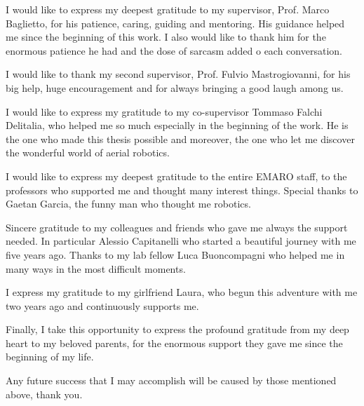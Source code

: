 

\begin{acknowledgements}


I would like to express my deepest gratitude to my supervisor, Prof. Marco Baglietto, for his patience, caring, guiding and mentoring. His guidance helped me since the beginning of this work. I also would like to thank him for the enormous patience he had and the dose of sarcasm added o each conversation. 

I would like to thank my second supervisor, Prof. Fulvio Mastrogiovanni, for his big help, huge encouragement and for always bringing a good laugh among us. 

I would like to express my gratitude to my co-supervisor Tommaso Falchi Delitalia, who helped me so much especially in the beginning of the work. He is the one who made this thesis possible and moreover, the one who let me discover the wonderful world of aerial robotics.

I would like to express my deepest gratitude to the entire EMARO staff, to the professors who supported me and thought many interest things. Special thanks to Gaetan Garcia, the funny man who thought me robotics. 

Sincere gratitude to my colleagues and friends who gave me always the support needed. In particular Alessio Capitanelli who started a beautiful journey with me five years ago. Thanks to my lab fellow Luca Buoncompagni who helped me in many ways in the most difficult moments.

I express my gratitude to my girlfriend Laura, who begun this adventure with me two years ago and continuously supports me.
 
Finally, I take this opportunity to express the profound gratitude from my deep heart to my beloved parents, for the enormous support they gave me since the beginning of my life.

Any future success that I may accomplish will be caused by those mentioned above, thank you.
  


\end{acknowledgements}